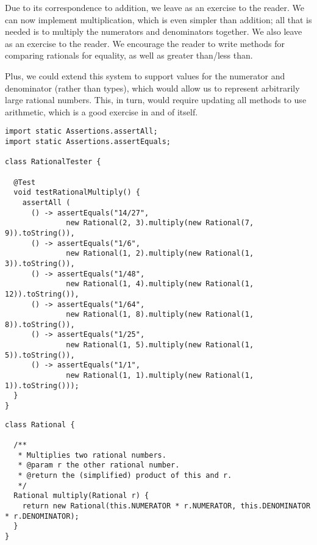 Due to its correspondence to addition, we leave  as an exercise to the reader. 
We can now implement multiplication, which is even simpler than addition; all that is needed is to multiply the numerators and denominators together. 
We also leave  as an exercise to the reader. 
We encourage the reader to write methods for comparing rationals for equality, as well as greater than/less than. 

Plus, we could extend this system to support  values for the numerator and denominator (rather than  types), which would allow us to represent arbitrarily large rational numbers. 
This, in turn, would require updating all methods to use  arithmetic, which is a good exercise in and of itself.

\enlargethispage{-4\baselineskip}
\begin{lstlisting}[language=MyJava]
import static Assertions.assertAll;
import static Assertions.assertEquals;

class RationalTester {

  @Test
  void testRationalMultiply() {
    assertAll (
      () -> assertEquals("14/27", 
              new Rational(2, 3).multiply(new Rational(7, 9)).toString()),
      () -> assertEquals("1/6", 
              new Rational(1, 2).multiply(new Rational(1, 3)).toString()),
      () -> assertEquals("1/48", 
              new Rational(1, 4).multiply(new Rational(1, 12)).toString()),
      () -> assertEquals("1/64", 
              new Rational(1, 8).multiply(new Rational(1, 8)).toString()),
      () -> assertEquals("1/25", 
              new Rational(1, 5).multiply(new Rational(1, 5)).toString()),
      () -> assertEquals("1/1", 
              new Rational(1, 1).multiply(new Rational(1, 1)).toString()));
  }
}
\end{lstlisting}

\enlargethispage{6\baselineskip}
\begin{lstlisting}[language=MyJava]
class Rational {

  /**
   * Multiplies two rational numbers.
   * @param r the other rational number.
   * @return the (simplified) product of this and r.
   */
  Rational multiply(Rational r) {
    return new Rational(this.NUMERATOR * r.NUMERATOR, this.DENOMINATOR * r.DENOMINATOR);
  }
}
\end{lstlisting}

